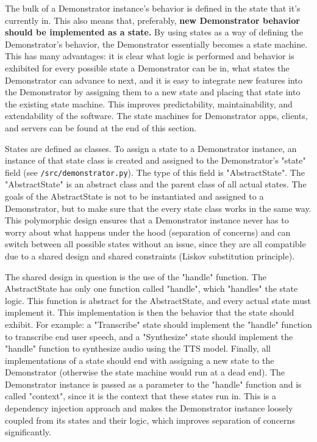 The bulk of a Demonstrator instance's behavior is defined in the state that it's currently in.
This also means that, preferably, \textbf{new Demonstrator behavior should be implemented as a state.}
By using states as a way of defining the Demonstrator's behavior, the Demonstrator essentially becomes a state machine.
This has many advantages: it is clear what logic is performed and behavior is exhibited for every possible state a Demonstrator can be in,  what states the Demonstrator can advance to next, and it is easy to integrate new features into the Demonstrator by assigning them to a new state and placing that state into the existing state machine.
This improves predictability, maintainability, and extendability of the software.
The state machines for Demonstrator apps, clients, and servers can be found at the end of this section.

States are defined as classes.
To assign a state to a Demonstrator instance, an instance of that state class is created and assigned to the Demonstrator's "state" field (see \texttt{/src/demonstrator.py}).
The type of this field is "AbstractState".
The "AbstractState" is an abstract class and the parent class of all actual states.
The goals of the AbstractState is not to be instantiated and assigned to a Demonstrator, but to make sure that the every state class works in the same way.
This polymorphic design ensures that a Demonstrator instance never has to worry about what happens under the hood (separation of concerns) and can switch between all possible states without an issue, since they are all compatible due to a shared design and shared constraints (Liskov substitution principle).

The shared design in question is the use of the "handle" function.
The AbstractState has only one function called "handle", which "handles" the state logic.
This function is abstract for the AbstractState, and every actual state must implement it.
This implementation is then the behavior that the state should exhibit.
For example: a "Transcribe" state should implement the "handle" function to transcribe end user speech, and a "Synthesize" state should implement the "handle" function to synthesize audio using the TTS model.
Finally, all implementations of a state should end with assigning a new state to the Demonstrator (otherwise the state machine would run at a dead end).
The Demonstrator instance is passed as a parameter to the "handle" function and is called "context", since it is the context that these states run in.
This is a dependency injection approach and makes the Demonstrator instance loosely coupled from its states and their logic, which improves separation of concerns significantly.

